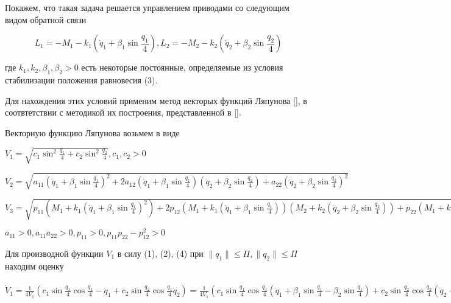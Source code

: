 Покажем, что такая задача решается управлением приводами со следующим видом обратной связи

\begin{equation}
L_1 = - M_1 - k_1 (\dot q_1 + \beta_1 \sin \frac{q_1}{4}), L_2 = - M_2 - k_2 (\dot q_2 + \beta_2 \sin \frac{q_2}{4})
\end{equation}

где $k_1, k_2, \beta_1, \beta_2 > 0$ есть некоторые постоянные, определяемые из условия стабилизации положения равновесия (3).

Для нахождения этих условий применим метод векторых функций Ляпунова [], в соотвтетствии с методикой их построения, представленной в [].

Векторную функцию Ляпунова возьмем в виде 

$V_1 = \sqrt{c_1 \sin^2 \frac{q_1}{4} + c_2 \sin^2 \frac{q_2}{4}}, c_1, c_2 > 0$

$V_2 = \sqrt{a_{11} (\dot q_1 + \beta_1 \sin \frac{q_1}{4})^2 + 2 a_{12} (\dot q_1 + \beta_1 \sin \frac{q_1}{4}) (\dot q_2 + \beta_2 \sin \frac{q_2}{4}) + a_{22} (\dot q_2 + \beta_2 \sin \frac{q_2}{4})^2}$
 
$V_3 = \sqrt{p_{11} (M_1 + k_1 (\dot q_1 + \beta_1 \sin \frac{q_1}{4})^2) + 2 p_{12} (M_1 + k_1 (\dot q_1 + \beta_1 \sin \frac{q_1}{4})) (M_2 + k_2 (\dot q_2 + \beta_2 \sin \frac{q_2}{4})) + p_{22} (M_1 + k_1 (\dot q_2 + \beta_2 \sin \frac{q_2}{4}))^2}$

$a_{11} > 0, a_{11} a_{22} > 0, p_{11} > 0, p_{11} p_{22} - p_{12}^2 > 0$

Для производной функции $V_1$ в силу (1), (2), (4) при $\| q_1 \| \le \Pi, \| q_2 \| \le \Pi$ находим оценку 

$\dot V_1 = \frac{1}{4 V_1} (c_1 \sin \frac{q_1}{4} \cos \frac{q_1}{4} - \dot q_1 + c_2 \sin \frac{q_2}{4} \cos \frac{q_1}{4} \dot q_2) = \frac{1}{4 V_1} (c_1 \sin \frac{q_1}{4} \cos \frac{q_1}{4} (\dot q_1 + \beta_1 \sin \frac{q_1}{4} - \beta_2 \sin \frac{q_1}{4}) + c_2 \sin \frac{q_2}{4} \cos \frac{q_2}{4} (\dot q_2 + \beta_2 \sin \frac{q_2}{4} - \beta_2 \sin \frac{q_2}{4})) \le \frac{1}{4 V_1} (\sqrt{c_1 \sin^2 \frac{q_1}{4} + c_2 \sin^2 \frac{q_2}{4}} \sqrt{c_1 (\dot q_1 + \beta_1 \sin \frac{q_1}{4})^2 + c_2 (\dot q_2 + \beta_2 \sin \frac{q_2}{4})^2} - \frac{\sqrt{2}}{2} (c_1 \beta_1 \sin^2 \frac{q_1}{4} c_2 \beta_2 \sin^2 \frac{q_2}{4})) \le - \alpha_1 V_1 + \alpha_2 V_2, \alpha_1 = \frac{\sqrt{2}}{8} min(\sqrt{c_1} \beta_1, \sqrt{c_2}, \beta_2), \alpha_2 = \frac{1}{4} \sqrt{\lambda_{AC}^{max}}$

